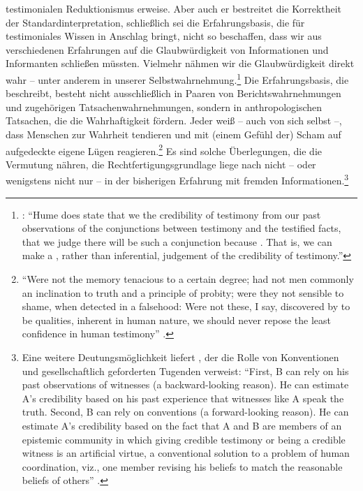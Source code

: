 testimonialen Reduktionismus erweise. Aber auch er bestreitet die Korrektheit
der Standardinterpretation, schließlich sei die Erfahrungsbasis, die 
für testimoniales Wissen in Anschlag bringt, nicht so beschaffen, dass wir aus
verschiedenen Erfahrungen auf die Glaubwürdigkeit von Informationen und
Informanten schließen müssten. Vielmehr nähmen wir die Glaubwürdigkeit direkt
wahr -- unter anderem in unserer
Selbstwahrnehmung.\footnote{\cite[Vgl.][305]{Faulkner:DavidHumesReductionistEpistemologyofTestimony1998}:
\enquote{Hume does  state that we  the credibility of
testimony from our past observations of the conjunctions between testimony and
the testified facts,  that we judge there will be such a conjunction
because . That is, we can make a
, rather than inferential, judgement of the credibility of
testimony.}} Die Erfahrungsbasis, die  beschreibt, besteht
nicht ausschließlich in Paaren von Berichtswahrnehmungen und zugehörigen
Tatsachenwahrnehmungen, sondern in anthropologischen Tatsachen, die die
Wahrhaftigkeit fördern.
Jeder weiß -- auch von sich selbst --, dass Menschen zur Wahrheit tendieren und
mit (einem Gefühl der) Scham auf aufgedeckte eigene Lügen
reagieren.\footnote{\enquote{Were not the memory tenacious to a certain degree;
had not men
commonly an inclination to truth and a principle of probity; were they not
sensible to shame, when detected in a falsehood: Were not these, I say,
discovered by  to be qualities, inherent in human nature, we
should never repose the least confidence in human testimony}
\parencite[][90]{Hume:AnEnquiryConcerningHumanUnderstanding1964}.} Es sind
solche Überlegungen, die die Vermutung nähren, die Rechtfertigungsgrundlage liege
nach  nicht -- oder wenigstens nicht nur -- in der
bisherigen Erfahrung mit fremden
Informationen.\footnote{Eine weitere Deutungsmöglichkeit liefert
, der die Rolle von
Konventionen und gesellschaftlich geforderten Tugenden verweist:
\enquote{First, B can rely on his past observations of witnesses (a
backward-looking reason). He can estimate A’s credibility based on his past
experience that witnesses like A speak the truth. Second, B can rely on
conventions (a forward-looking reason).
He can estimate A’s credibility based on the fact that A and B are members of
an epistemic community in which giving credible testimony or being a credible
witness is an artificial virtue, a conventional solution to a problem of human
coordination, viz., one member revising his beliefs to match the reasonable
beliefs of others} \parencite[][19]{Root:HumeontheVirtuesofTestimony2001}.}

